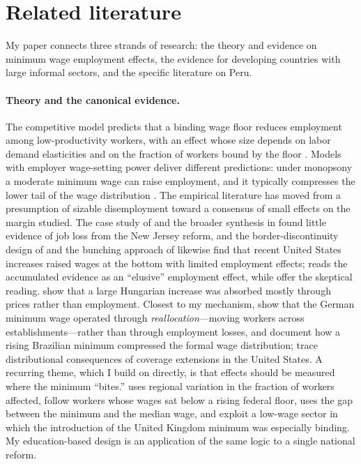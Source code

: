 \section{Related literature}\label{sec:literature}

My paper connects three strands of research: the theory and evidence on minimum
wage employment effects, the evidence for developing countries with large informal
sectors, and the specific literature on Peru.

\paragraph{Theory and the canonical evidence.} The competitive model predicts that a
binding wage floor reduces employment among low-productivity workers, with an effect
whose size depends on labor demand elasticities and on the fraction of workers bound
by the floor \citep{brown_1999}. Models with employer wage-setting power deliver
different predictions: under monopsony a moderate minimum wage can raise employment,
and it typically compresses the lower tail of the wage distribution
\citep{manning_2003}. The empirical literature has moved from a presumption of sizable
disemployment toward a consensus of small effects on the margin studied. The case
study of \citet{card_krueger_1994} and the broader synthesis in \citet{card_krueger_1995}
found little evidence of job loss from the New Jersey reform, and the border-discontinuity
design of \citet{dube_lester_reich_2010} and the bunching approach of
\citet{cengiz_2019} likewise find that recent United States increases raised wages at
the bottom with limited employment effects; \citet{manning_2021} reads the accumulated
evidence as an ``elusive'' employment effect, while \citet{neumark_wascher_2007} offer
the skeptical reading. \citet{harasztosi_lindner_2019} show that a large Hungarian
increase was absorbed mostly through prices rather than employment. Closest to my
mechanism, \citet{dustmann_2022} show that the German minimum wage operated through
\emph{reallocation}---moving workers across establishments---rather than through
employment losses, and \citet{engbom_moser_2022} document how a rising Brazilian
minimum compressed the formal wage distribution; \citet{derenoncourt_montialoux_2021}
trace distributional consequences of coverage extensions in the United States.
A recurring theme, which I build on directly, is that effects should be measured
where the minimum ``bites.'' \citet{card_1992} uses regional variation in the
fraction of workers affected, \citet{clemens_wither_2019} follow workers whose wages
sat below a rising federal floor, \citet{lee_1999} uses the gap between the minimum and
the median wage, and \citet{machin_manning_rahman_2003} exploit a low-wage sector in
which the introduction of the United Kingdom minimum was especially binding. My
education-based design is an application of the same logic to a single national reform.

